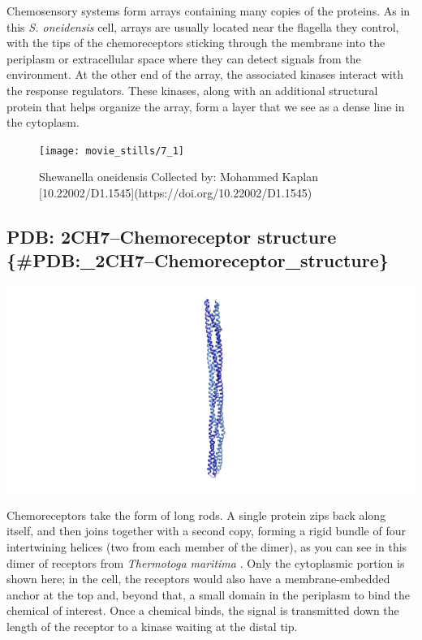 \documentclass[]{tufte-book}
\begin{document}
Chemosensory systems form arrays containing many copies of the proteins.
As in this \emph{S. oneidensis} cell, arrays are usually located near
the flagella they control, with the tips of the chemoreceptors sticking
through the membrane into the periplasm or extracellular space where
they can detect signals from the environment. At the other end of the
array, the associated kinases interact with the response regulators.
These kinases, along with an additional structural protein that helps
organize the array, form a layer that we see as a dense line in the
cytoplasm.

\begin{figure}
\texttt{[image: movie\_stills/7\_1]} \caption[Shewanella oneidensis Collected by]{Shewanella oneidensis Collected by: Mohammed Kaplan [10.22002/D1.1545](https://doi.org/10.22002/D1.1545)}\label{fig:unnamed-chunk-122}
\end{figure}

\subsection{PDB: 2CH7--Chemoreceptor structure
\{\#PDB:\_2CH7--Chemoreceptor\_structure\}}\label{pdb-2ch7chemoreceptor-structure-pdb_2ch7chemoreceptor_structure}

\includegraphics{img/schematics/7_1_1}

Chemoreceptors take the form of long rods. A single protein zips back
along itself, and then joins together with a second copy, forming a
rigid bundle of four intertwining helices (two from each member of the
dimer), as you can see in this dimer of receptors from \emph{Thermotoga
maritima} \citet{park2006}. Only the cytoplasmic portion is shown here;
in the cell, the receptors would also have a membrane-embedded anchor at
the top and, beyond that, a small domain in the periplasm to bind the
chemical of interest. Once a chemical binds, the signal is transmitted
down the length of the receptor to a kinase waiting at the distal tip.
\end{document}
